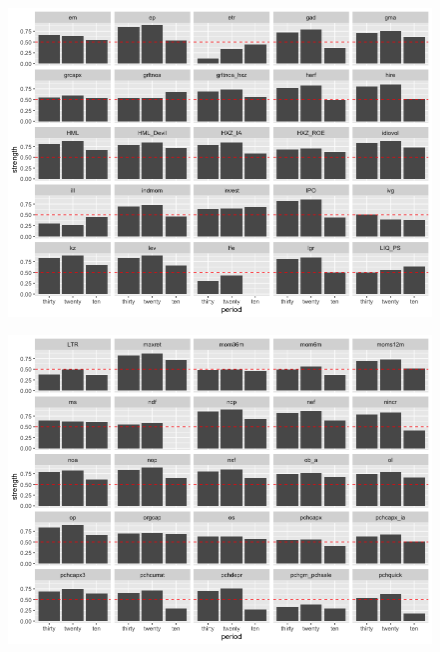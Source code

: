 \begin{landscape}
	\begin{figure}[ht]
		\includegraphics[scale = 0.7]{strength_comparison_III}
		\centering
	\end{figure}
\end{landscape}

\begin{landscape}
	\begin{figure}[ht]
		\includegraphics[scale = 0.7]{strength_comparison_IV}
		\centering
	\end{figure}
\end{landscape}

